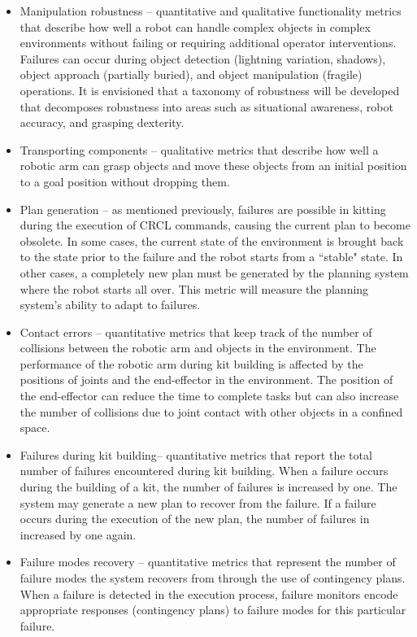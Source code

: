 \begin{itemize}
\item \sf Manipulation robustness \rm -- quantitative and qualitative functionality metrics that describe how well a robot can handle complex objects in complex environments without failing or requiring additional operator interventions. Failures can occur during object detection (lightning variation, shadows), object approach (partially buried), and object manipulation (fragile) operations.
It is envisioned that a taxonomy of robustness will be developed that decomposes robustness into areas such as situational awareness, robot accuracy, and grasping dexterity.\\

\item \sf Transporting components \rm -- qualitative metrics that describe how well a robotic arm can grasp objects and move these objects from an initial position to a goal position without dropping them.\\

\item \sf Plan generation \rm -- as mentioned previously, failures are possible in kitting during the execution of CRCL commands, causing the current plan to become obsolete. In some cases, the current state of the environment is brought back to the state prior to the failure and the robot starts from a ``stable" state. In other cases, a completely new plan must be generated by the planning system where the robot starts all over. This metric will measure the planning system\rq{}s ability to adapt to failures.\\

\item \sf Contact errors \rm -- quantitative metrics that keep track of the number of collisions between the robotic arm and objects in the environment. The performance of the robotic arm during kit building is affected by the positions of joints and the end-effector in the environment. The position of the end-effector can reduce the time to complete tasks but can also increase the number of collisions due to joint contact with other objects in a confined space.\\

\item \sf Failures during kit building\rm -- quantitative metrics that report the total number of failures encountered during kit building. When a failure occurs during the
building of a kit, the number of failures is increased by one. The system may generate a new plan to recover from the failure. If a failure occurs during the execution of the new
plan, the number of failures in increased by one again.\\

\item \sf Failure modes recovery \rm -- quantitative metrics that represent the number of failure modes the system recovers from through the use of contingency plans. When a failure is detected in the execution process, failure monitors encode appropriate responses (contingency plans) to failure modes for this particular failure.\\

\end{itemize}
